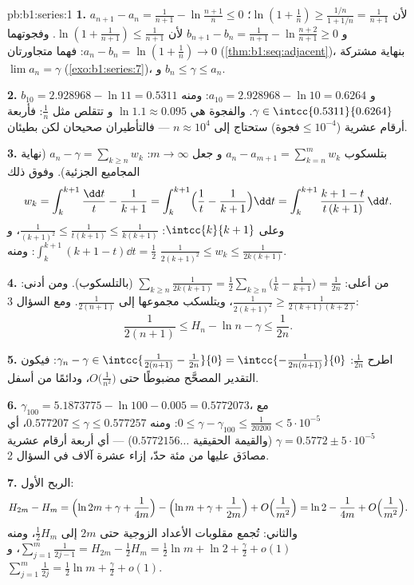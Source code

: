 \begin{solution}{pb:b1:series:1}
\textbf{1.} $a_{n+1} - a_n = \frac{1}{n+1} - \ln\frac{n+1}{n}
\leq 0$ لأن $\ln(1 + \frac1n) \geq \frac{1/n}{1 + 1/n} =
\frac{1}{n+1}$؛ و $b_{n+1} - b_n = \frac{1}{n+1} -
\ln\frac{n+2}{n+1} \geq 0$ لأن $\ln(1 + \frac{1}{n+1}) \leq
\frac{1}{n+1}$. وفجوتهما $a_n - b_n = \ln(1 + \frac1n) \to 0$:
فهما متجاورتان (\cref{thm:b1:seq:adjacent})، بنهاية مشتركة $\lim
a_n = \gamma$ (\cref{exo:b1:series:7})، و $b_n \leq \gamma
\leq a_n$.

\textbf{2.} $b_{10} = 2.928968 - \ln 11 = 0.5311$ و $a_{10} =
2.928968 - \ln 10 = 0.6264$: ومنه $\gamma \in
\intcc{0.5311}{0.6264}$. والفجوة هي $\ln 1.1 \approx 0.095$ و
تتقلص مثل $\frac1n$: فأربعة أرقام عشرية ($\text{فجوة} \leq
10^{-4}$) ستحتاج إلى $n \approx 10^4$ --- فالتأطيران
صحيحان لكن بطيئان.

\textbf{3.} بتلسكوب $a_n - a_{m+1} = \sum_{k=n}^{m} w_k$ و
جعل $m \to \infty$: $a_n - \gamma = \sum_{k\geq n} w_k$
(نهاية المجاميع الجزئية). وفوق ذلك
\[
w_k = \int_k^{k+1} \frac{\dd t}{t} - \frac{1}{k+1}
= \int_k^{k+1} \Bigl(\frac1t - \frac{1}{k+1}\Bigr)\dd t
= \int_k^{k+1} \frac{k + 1 - t}{t\,(k+1)}\,\dd t .
\]
وعلى $\intcc{k}{k+1}$: $\frac{1}{(k+1)^2} \leq \frac{1}{t(k+1)}
\leq \frac{1}{k(k+1)}$، و $\int_k^{k+1}(k + 1 - t)\dd t =
\frac12$: ومنه $\frac{1}{2(k+1)^2} \leq w_k \leq
\frac{1}{2k(k+1)}$.

\textbf{4.} من أعلى: $\sum_{k \geq n} \frac{1}{2k(k+1)} =
\frac12\sum_{k\geq n}\bigl(\frac1k - \frac{1}{k+1}\bigr) =
\frac{1}{2n}$ (بالتلسكوب). ومن أدنى: $\frac{1}{2(k+1)^2} \geq
\frac{1}{2(k+1)(k+2)}$، ويتلسكب مجموعها إلى
$\frac{1}{2(n+1)}$. ومع السؤال 3:
\[
\frac{1}{2(n+1)} \leq H_n - \ln n - \gamma \leq \frac{1}{2n} .
\]

\textbf{5.} اطرح $\frac{1}{2n}$: $\gamma_n - \gamma \in
\intcc{\frac{1}{2(n+1)} - \frac{1}{2n}}{0} =
\intcc{-\frac{1}{2n(n+1)}}{0}$: فيكون التقدير المصحَّح مضبوطًا
حتى $O\bigl(\frac{1}{n^2}\bigr)$، ودائمًا من أسفل.

\textbf{6.} $\gamma_{100} = 5.1873775 - \ln 100 - 0.005 =
0.5772073$، مع $0 \leq \gamma - \gamma_{100} \leq
\frac{1}{20200} < 5\cdot10^{-5}$: ومنه $0.577207 \leq \gamma
\leq 0.577257$، أي $\gamma = 0.5772 \pm 5\cdot10^{-5}$ (والقيمة
الحقيقية $0.5772156\dots$) --- أي أربعة أرقام عشرية مصادَق عليها من
مئة حدّ، إزاء عشرة آلاف في السؤال 2.

\textbf{7.} الربح الأول:
\[
H_{2m} - H_m = \Bigl(\ln 2m + \gamma + \frac{1}{4m}\Bigr)
- \Bigl(\ln m + \gamma + \frac{1}{2m}\Bigr) +
O\Bigl(\frac{1}{m^2}\Bigr)
= \ln 2 - \frac{1}{4m} + O\Bigl(\frac{1}{m^2}\Bigr).
\]
والثاني: تُجمع مقلوبات الأعداد الزوجية حتى $2m$ إلى $\frac12 H_m$، ومنه
$\sum_{j=1}^{m}\frac{1}{2j-1} = H_{2m} - \frac12 H_m = \frac12
\ln m + \ln 2 + \frac\gamma2 + o(1)$، و $\sum_{j=1}^m
\frac{1}{2j} = \frac12\ln m + \frac\gamma2 + o(1)$.


\end{solution}
